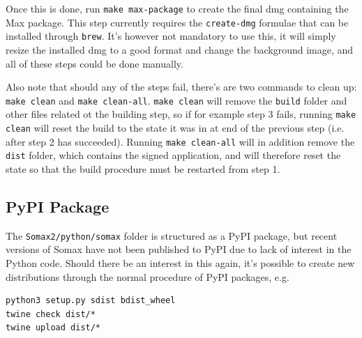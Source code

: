 Once this is done, run \texttt{make max-package} to create the final dmg containing the Max package. This step currently requires the \texttt{create-dmg} formulae that can be installed through \texttt{brew}. It's however not mandatory to use this, it will simply resize the installed dmg to a good format and change the background image, and all of these steps could be done manually.

Also note that should any of the steps fail, there's are two commands to clean up: \texttt{make clean} and \texttt{make clean-all}. \texttt{make clean} will remove the \texttt{build} folder and other files related ot the building step, so if for example step 3 fails, running \texttt{make clean} will reset the build to the state it was in at end of the previous step (i.e. after step 2 has succeeded). Running \texttt{make clean-all} will in addition remove the \texttt{dist} folder, which contains the signed application, and will therefore reset the state so that the build procedure must be restarted from step 1.


\subsection{PyPI Package}\label{ssec:2-pypi-package}
The \texttt{Somax2/python/somax} folder is structured as a PyPI package, but recent versions of Somax have not been published to PyPI due to lack of interest in the Python code. Should there be an interest in this again, it's possible to create new distributions through the normal procedure of PyPI packages, e.g.
\begin{lstlisting}
python3 setup.py sdist bdist_wheel
twine check dist/*
twine upload dist/*
\end{lstlisting}



